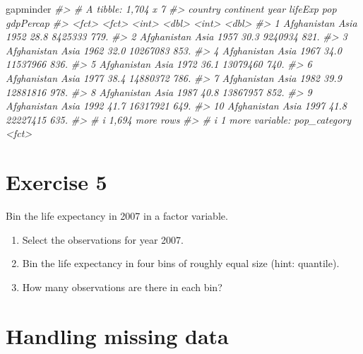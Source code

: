 \documentclass[
]{book}
\newenvironment{Shaded}{\begin{snugshade}}{\end{snugshade}}
\newcommand{\CommentTok}[1]{\textcolor[rgb]{0.56,0.35,0.01}{\textit{#1}}}
\newcommand{\NormalTok}[1]{#1}
\begin{document}
\begin{Shaded}
\begin{Highlighting}[]
\NormalTok{gapminder}
\CommentTok{\#\textgreater{} \# A tibble: 1,704 x 7}
\CommentTok{\#\textgreater{}    country     continent  year lifeExp      pop gdpPercap}
\CommentTok{\#\textgreater{}    \textless{}fct\textgreater{}       \textless{}fct\textgreater{}     \textless{}int\textgreater{}   \textless{}dbl\textgreater{}    \textless{}int\textgreater{}     \textless{}dbl\textgreater{}}
\CommentTok{\#\textgreater{}  1 Afghanistan Asia       1952    28.8  8425333      779.}
\CommentTok{\#\textgreater{}  2 Afghanistan Asia       1957    30.3  9240934      821.}
\CommentTok{\#\textgreater{}  3 Afghanistan Asia       1962    32.0 10267083      853.}
\CommentTok{\#\textgreater{}  4 Afghanistan Asia       1967    34.0 11537966      836.}
\CommentTok{\#\textgreater{}  5 Afghanistan Asia       1972    36.1 13079460      740.}
\CommentTok{\#\textgreater{}  6 Afghanistan Asia       1977    38.4 14880372      786.}
\CommentTok{\#\textgreater{}  7 Afghanistan Asia       1982    39.9 12881816      978.}
\CommentTok{\#\textgreater{}  8 Afghanistan Asia       1987    40.8 13867957      852.}
\CommentTok{\#\textgreater{}  9 Afghanistan Asia       1992    41.7 16317921      649.}
\CommentTok{\#\textgreater{} 10 Afghanistan Asia       1997    41.8 22227415      635.}
\CommentTok{\#\textgreater{} \# i 1,694 more rows}
\CommentTok{\#\textgreater{} \# i 1 more variable: pop\_category \textless{}fct\textgreater{}}
\end{Highlighting}
\end{Shaded}

\section*{Exercise 5}\label{exercise-5-2}

Bin the life expectancy in 2007 in a factor variable.

\begin{enumerate}
\def\labelenumi{\arabic{enumi}.}
\item
  Select the observations for year 2007.
\item
  Bin the life expectancy in four bins of
  roughly equal size (hint: quantile).
\item
  How many observations are there
  in each bin?
\end{enumerate}

\section*{Handling missing data}\label{handling-missing-data}
\end{document}
